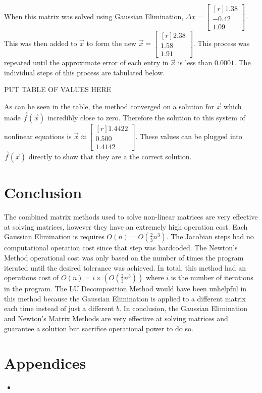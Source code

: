 \documentclass{article}
\begin{document}
When this matrix was solved using Gaussian Elimination, $\Delta x = \begin{bmatrix}[r] 1.38\\-0.42\\1.09 \end{bmatrix}$. This was then added to $\vec{x}$ to form the new $\vec{x} = \begin{bmatrix}[r] 2.38 \\ 1.58 \\ 1.91 \end{bmatrix}$. This process was repeated until the approximate error of each entry in $\vec{x}$ is less than $0.0001$. The individual steps of this process are tabulated below.

\bigskip\bigskip

PUT TABLE OF VALUES HERE

\bigskip\bigskip

As can be seen in the table, the method converged on a solution for $\vec{x}$ which made $\vec{f}(\vec{x})$ incredibly close to zero. Therefore the solution to this system of nonlinear equations is $\vec{x} \approx \begin{bmatrix}[r] 1.4422 \\ 0.500 \\ 1.4142 \end{bmatrix}$. These values can be plugged into $\vec{f}(\vec{x})$ directly to show that they are a the correct solution.

\section*{Conclusion}
The combined matrix methods used to solve non-linear matrices are very effective at solving matrices, however they have an extremely high operation cost. Each Gaussian Elimination is requires $O(n)=O(\frac{2}{3}n^3)$. The Jacobian steps had no computational operation cost since that step was hardcoded. The Newton's Method operational cost was only based on the number of times the program iterated until the desired tolerance was achieved. In total, this method had an operations cost of $O(n)= i\times(O(\frac{2}{3}n^3))$ where $i$ is the number of iterations in the program. The LU Decomposition Method would have been unhelpful in this method because the Gaussian Elimination is applied to a different matrix each time instead of just a different $b$. In conclusion, the Gaussian Elimination and Newton's Matrix Methods are very effective at solving matrices and guarantee a solution but sacrifice operational power to do so.

\section*{Appendices}

\begin{itemize}
\item
\end{itemize}
\end{document}
